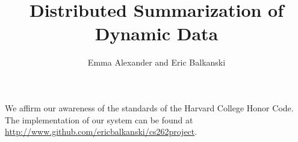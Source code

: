 \documentclass[11pt]{article} %
\title{Distributed Summarization of Dynamic Data}
\author{Emma Alexander and Eric Balkanski}
\begin{document}
\maketitle

We affirm our awareness of the standards of the Harvard College Honor Code. The implementation of our system can be found at \url{http://www.github.com/ericbalkanski/cs262project}.









 
\end{document}

